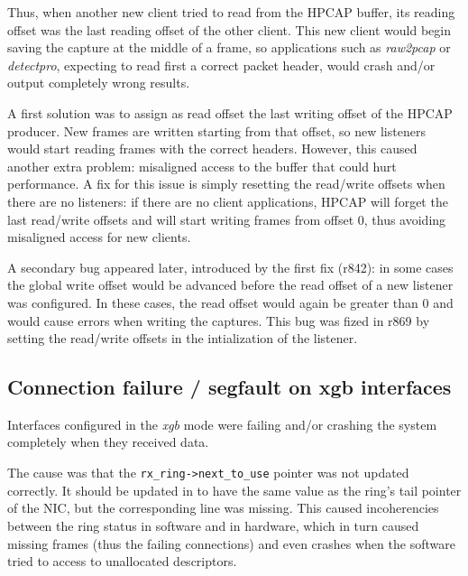 Thus, when another new client tried to read from the HPCAP buffer, its reading offset was the last reading offset of the other client. This new client would begin saving the capture at the middle of a frame, so applications such as \textit{raw2pcap} or \textit{detectpro}, expecting to read first a correct packet header, would crash and/or output completely wrong results.

A first solution was to assign as read offset the last writing offset of the HPCAP producer. New frames are written starting from that offset, so new listeners would start reading frames with the correct headers. However, this caused another extra problem: misaligned access to the buffer that could hurt performance. A fix for this issue is simply resetting the read/write offsets when there are no listeners: if there are no client applications, HPCAP will forget the last read/write offsets and will start writing frames from offset 0, thus avoiding misaligned access for new clients.

A secondary bug appeared later, introduced by the first fix (r842): in some cases the global write offset would be advanced before the read offset of a new listener was configured. In these cases, the read offset would again be greater than 0 and would cause errors when writing the captures. This bug was fized in r869 by setting the read/write offsets in the intialization of the listener.

\subsection{Connection failure / segfault on xgb interfaces}

\begin{bugdata}
\end{bugdata}

Interfaces configured in the \textit{xgb} mode were failing and/or crashing the system completely when they received data.

The cause was that the \texttt{rx\_ring->next\_to\_use} pointer was not updated correctly. It should be updated in  to have the same value as the ring's tail pointer of the NIC, but the corresponding line was missing. This caused incoherencies between the ring status in software and in hardware, which in turn caused missing frames (thus the failing connections) and even crashes when the software tried to access to unallocated descriptors.

